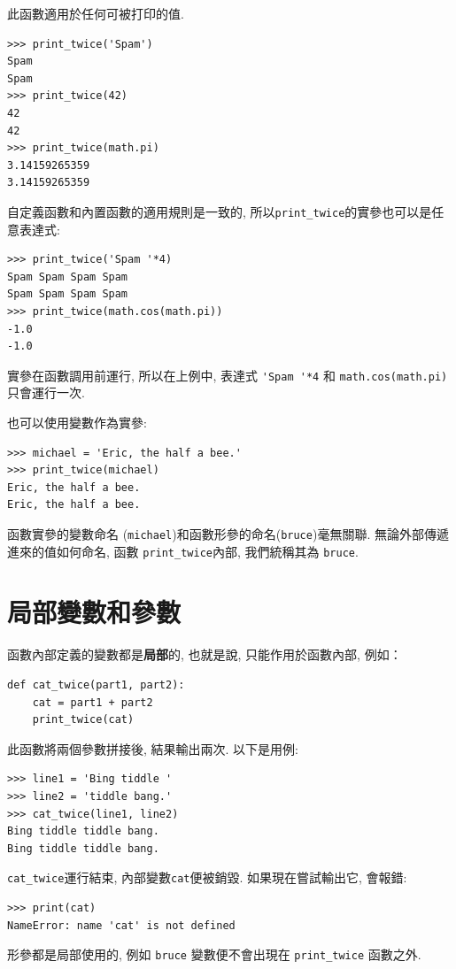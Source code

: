 \documentclass[10pt]{book}
\begin{document}
此函數適用於任何可被打印的值. 

\begin{verbatim}
>>> print_twice('Spam')
Spam
Spam
>>> print_twice(42)
42
42
>>> print_twice(math.pi)
3.14159265359
3.14159265359
\end{verbatim}
%
自定義函數和內置函數的適用規則是一致的, 
所以\verb"print_twice"的實參也可以是任意表達式:

\begin{verbatim}
>>> print_twice('Spam '*4)
Spam Spam Spam Spam
Spam Spam Spam Spam
>>> print_twice(math.cos(math.pi))
-1.0
-1.0
\end{verbatim}
%
實參在函數調用前運行, 所以在上例中, 表達式 \verb"'Spam '*4" 和
{\tt math.cos(math.pi)} 只會運行一次. 

也可以使用變數作為實參:

\begin{verbatim}
>>> michael = 'Eric, the half a bee.'
>>> print_twice(michael)
Eric, the half a bee.
Eric, the half a bee.
\end{verbatim}
%
函數實參的變數命名 ({\tt michael})和函數形參的命名({\tt bruce})毫無關聯. 
無論外部傳遞進來的值如何命名, 函數 \verb"print_twice"內部, 我們統稱其為 {\tt bruce}. 


\section{局部變數和參數}

函數內部定義的變數都是{\bf 局部}的, 也就是說, 只能作用於函數內部, 例如：

\begin{verbatim}
def cat_twice(part1, part2):
    cat = part1 + part2
    print_twice(cat)
\end{verbatim}
%
此函數將兩個參數拼接後, 結果輸出兩次. 以下是用例:

\begin{verbatim}
>>> line1 = 'Bing tiddle '
>>> line2 = 'tiddle bang.'
>>> cat_twice(line1, line2)
Bing tiddle tiddle bang.
Bing tiddle tiddle bang.
\end{verbatim}
%
\verb"cat_twice"運行結束, 內部變數{\tt cat}便被銷毀. 
如果現在嘗試輸出它, 會報錯:

\begin{verbatim}
>>> print(cat)
NameError: name 'cat' is not defined
\end{verbatim}
%
形參都是局部使用的, 例如 {\tt bruce} 變數便不會出現在 \verb"print_twice" 函數之外.
\end{document}

